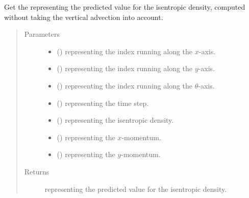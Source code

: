 \documentclass[letterpaper,10pt,english]{sphinxmanual}
\begin{document}
\begin{fulllineitems}
\begin{fulllineitems}
\label{\detokenize{api:tasmania.dycore.flux_isentropic_maccormack.FluxIsentropicMacCormack._get_maccormack_horizontal_predicted_value_s}}
Get the  representing the predicted value for the isentropic density,
computed without taking the vertical advection into account.
\begin{quote}\begin{description}
\item[{Parameters}] \leavevmode\begin{itemize}
\item {} 
 () \textendash{}  representing the index running along the \(x\)-axis.

\item {} 
 () \textendash{}  representing the index running along the \(y\)-axis.

\item {} 
 () \textendash{}  representing the index running along the \(\theta\)-axis.

\item {} 
 () \textendash{}  representing the time step.

\item {} 
 () \textendash{}  representing the isentropic density.

\item {} 
 () \textendash{}  representing the \(x\)-momentum.

\item {} 
 () \textendash{}  representing the \(y\)-momentum.

\end{itemize}

\item[{Returns}] \leavevmode
{} representing the predicted value for the isentropic density.


\end{description}
\end{quote}
\end{fulllineitems}
\end{fulllineitems}
\end{document}
